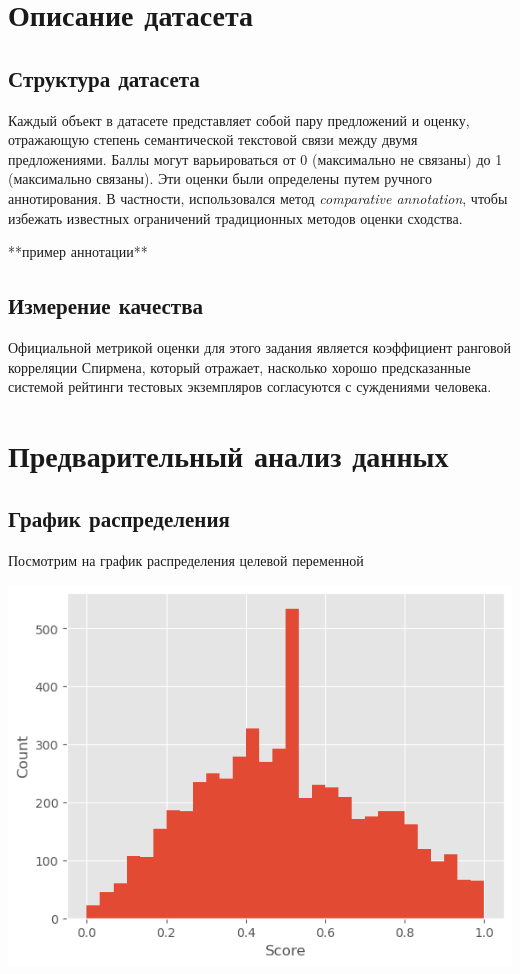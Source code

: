 \documentclass[12pt]{article}
\begin{document}
\newpage

\section{Описание датасета}
\subsection{Структура датасета}
Каждый объект в датасете представляет собой пару предложений и оценку, отражающую степень семантической текстовой связи между двумя предложениями. Баллы могут варьироваться от 0 (максимально не связаны) до 1 (максимально связаны). Эти оценки были определены путем ручного аннотирования. В частности, использовался метод \textit{comparative annotation}, чтобы избежать известных ограничений традиционных методов оценки сходства.

**пример аннотации** 

\subsection{Измерение качества}
Официальной метрикой оценки для этого задания является коэффициент ранговой корреляции Спирмена, который отражает, насколько хорошо предсказанные системой рейтинги тестовых экземпляров согласуются с суждениями человека.

\newpage

\section{Предварительный анализ данных}
\subsection{График распределения}
Посмотрим на график распределения целевой переменной

\includegraphics[width=0.7\linewidth]{распределение}
\end{document}
